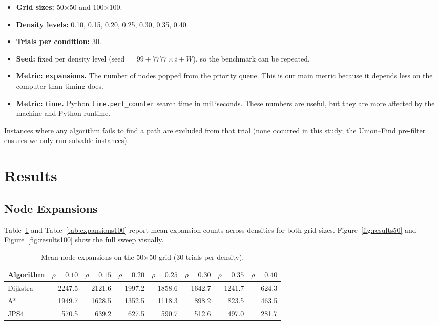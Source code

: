 \documentclass[11pt,a4paper]{article}
\begin{document}
\begin{itemize}[nosep]
  \item \textbf{Grid sizes:} 50$\times$50 and 100$\times$100.
  \item \textbf{Density levels:} 0.10, 0.15, 0.20, 0.25, 0.30, 0.35, 0.40.
  \item \textbf{Trials per condition:} 30.
  \item \textbf{Seed:} fixed per density level (seed $= 99 + 7777 \times i + W$), so the benchmark can be repeated.
  \item \textbf{Metric: expansions.} The number of nodes popped from the priority queue. This is our main metric because it depends less on the computer than timing does.
  \item \textbf{Metric: time.} Python \texttt{time.perf\_counter} search time in milliseconds. These numbers are useful, but they are more affected by the machine and Python runtime.
\end{itemize}

Instances where any algorithm fails to find a path are excluded from that trial (none occurred in this study; the Union--Find pre-filter ensures we only run solvable instances).

\section{Results}

\subsection{Node Expansions}

Table~\ref{tab:expansions50} and Table~\ref{tab:expansions100} report mean expansion counts across densities for both grid sizes. Figure~\ref{fig:results50} and Figure~\ref{fig:results100} show the full sweep visually.

\begin{table}[!t]
\centering
\caption{Mean node expansions on the 50$\times$50 grid (30 trials per density).}
\label{tab:expansions50}
\small
\begin{tabular}{lrrrrrrr}
\toprule
Algorithm & $\rho=0.10$ & $\rho=0.15$ & $\rho=0.20$ & $\rho=0.25$ & $\rho=0.30$ & $\rho=0.35$ & $\rho=0.40$ \\
\midrule
Dijkstra  & 2247.5 & 2121.6 & 1997.2 & 1858.6 & 1642.7 & 1241.7 &  624.3 \\
A*        & 1949.7 & 1628.5 & 1352.5 & 1118.3 &  898.2 &  823.5 &  463.5 \\
JPS4      &  570.5 &  639.2 &  627.5 &  590.7 &  512.6 &  497.0 &  281.7 \\
\bottomrule
\end{tabular}
\end{table}
\end{document}
